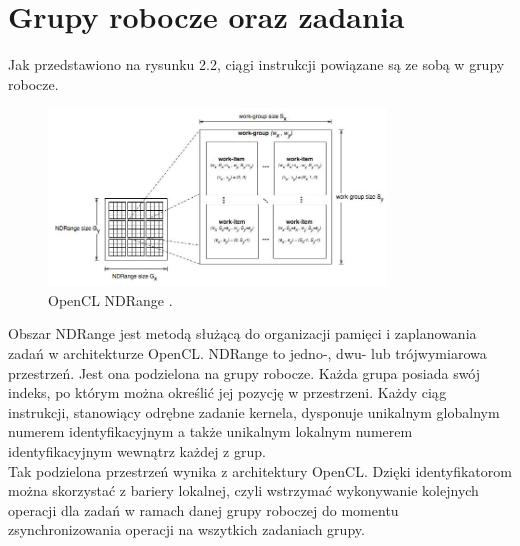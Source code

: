 \section{Grupy robocze oraz zadania}
Jak przedstawiono na rysunku 2.2, ciągi instrukcji powiązane są ze sobą w grupy robocze. \\
\begin{figure}[h]
\centering
\includegraphics[width=0.8\textwidth]{figures/ndrange.jpg}
\caption{OpenCL NDRange \protect\footnotemark.}%
\label{rys:ndrange}
\end{figure}
Obszar NDRange jest metodą służącą do organizacji pamięci i zaplanowania zadań w architekturze OpenCL. NDRange to jedno-, dwu- lub trójwymiarowa przestrzeń. Jest ona podzielona na grupy robocze. Każda grupa posiada swój indeks, po którym można określić jej pozycję w przestrzeni. Każdy ciąg instrukcji, stanowiący odrębne zadanie kernela, dysponuje unikalnym globalnym numerem identyfikacyjnym a także unikalnym lokalnym numerem identyfikacyjnym wewnątrz każdej z grup.  \\
Tak podzielona przestrzeń wynika z architektury OpenCL. Dzięki identyfikatorom można skorzystać z bariery lokalnej, czyli wstrzymać wykonywanie kolejnych operacji dla zadań w ramach danej grupy roboczej do momentu zsynchronizowania operacji na wszytkich zadaniach grupy.

